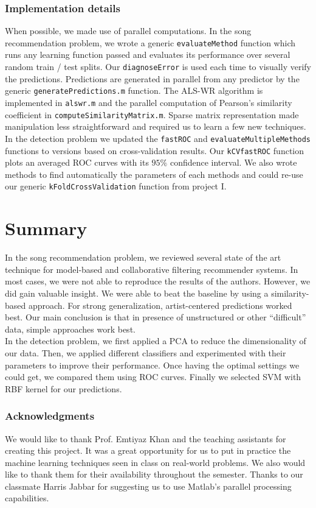 \documentclass[10pt,a4paper]{article}
\begin{document}
 \subsubsection*{Implementation details}
  When possible, we made use of parallel computations. In the song recommendation problem, we wrote a generic \texttt{evaluateMethod} function which runs any learning function passed and evaluates its performance over several random train / test splits. Our \texttt{diagnoseError} is used each time to visually verify the predictions. Predictions are generated in parallel from any predictor by the generic \texttt{generatePredictions.m} function. The ALS-WR algorithm is implemented in \texttt{alswr.m} and the parallel computation of Pearson's similarity coefficient in \texttt{computeSimilarityMatrix.m}. Sparse matrix representation made manipulation less straightforward and required us to learn a few new techniques.\\
  In the detection problem we updated the \texttt{fastROC} and \texttt{evaluateMultipleMethods} functions to versions based on cross-validation results. Our \texttt{kCVfastROC} function plots an averaged ROC curves with its $95\%$ confidence interval. We also wrote methods to find automatically the parameters of each methods and could re-use our generic \texttt{kFoldCrossValidation} function from project I.

\section{Summary}
  In the song recommendation problem, we reviewed several state of the art technique for model-based and collaborative filtering recommender systems. In most cases, we were not able to reproduce the results of the authors. However, we did gain valuable insight. We were able to beat the baseline by using a similarity-based approach. For strong generalization, artist-centered predictions worked best. Our main conclusion is that in presence of unstructured or other ``difficult'' data, simple approaches work best.\\
  In the detection problem, we first applied a PCA to reduce the dimensionality of our data. Then, we applied different classifiers and experimented with their parameters to improve their performance. Once having the optimal settings we could get, we compared them using ROC curves. Finally we selected SVM with RBF kernel for our predictions.

    \subsubsection*{Acknowledgments}
    We would like to thank Prof. Emtiyaz Khan and the teaching assistants for creating this project. It was a great opportunity for us to put in practice the machine learning techniques seen in class on real-world problems. We also would like to thank them for their availability throughout the semester. Thanks to our classmate Harris Jabbar for suggesting us to use Matlab's parallel processing capabilities.\\
\end{document}
